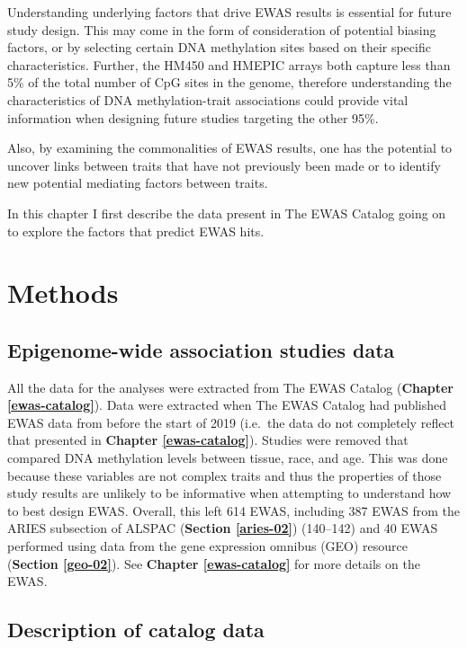 \documentclass[11pt,twoside]{bristolthesis}
\begin{document}
Understanding underlying factors that drive EWAS results is essential for future study design. This may come in the form of consideration of potential biasing factors, or by selecting certain DNA methylation sites based on their specific characteristics. Further, the HM450 and HMEPIC arrays both capture less than 5\% of the total number of CpG sites in the genome, therefore understanding the characteristics of DNA methylation-trait associations could provide vital information when designing future studies targeting the other 95\%.

Also, by examining the commonalities of EWAS results, one has the potential to uncover links between traits that have not previously been made or to identify new potential mediating factors between traits.

In this chapter I first describe the data present in The EWAS Catalog going on to explore the factors that predict EWAS hits.

\newpage

\hypertarget{methods-04}{%
\section{Methods}\label{methods-04}}

\hypertarget{ewas-data-04}{%
\subsection{Epigenome-wide association studies data}\label{ewas-data-04}}

All the data for the analyses were extracted from The EWAS Catalog (\textbf{Chapter \ref{ewas-catalog}}). Data were extracted when The EWAS Catalog had published EWAS data from before the start of 2019 (i.e.~the data do not completely reflect that presented in \textbf{Chapter \ref{ewas-catalog}}). Studies were removed that compared DNA methylation levels between tissue, race, and age. This was done because these variables are not complex traits and thus the properties of those study results are unlikely to be informative when attempting to understand how to best design EWAS. Overall, this left 614 EWAS, including 387 EWAS from the ARIES subsection of ALSPAC (\textbf{Section \ref{aries-02}}) (140--142) and 40 EWAS performed using data from the gene expression omnibus (GEO) resource (\textbf{Section \ref{geo-02}}). See \textbf{Chapter \ref{ewas-catalog}} for more details on the EWAS.

\hypertarget{description-of-data}{%
\subsection*{Description of catalog data}\label{description-of-data}}
\end{document}
